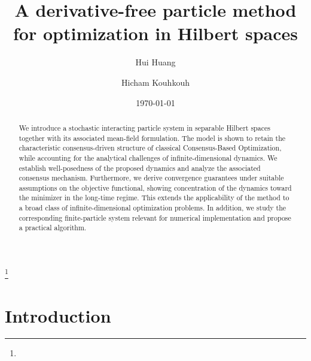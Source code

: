\documentclass[12pt]{amsart}
\numberwithin{equation}{section}
\begin{document}
\title[Particle method for optimization in Hilbert spaces]
{A derivative-free particle method for   optimization in Hilbert spaces}
\thanks{
}

\author{Hui Huang}
\address{Hui Huang \newline
Hunan University, 
School of Mathematics, \newline
Changsha, China
}

\author{Hicham Kouhkouh}
\address{Hicham Kouhkouh \newline 
University of Graz, 
Department of Mathematics and Scientific Computing -- NAWI, \newline
Graz, Austria
}



\date{\today}


\begin{abstract}
We introduce a stochastic interacting particle system in separable Hilbert spaces together with its associated mean-field formulation. The model is shown to retain the characteristic consensus-driven structure of classical Consensus-Based Optimization, while accounting for the analytical challenges of infinite-dimensional dynamics. We establish well-posedness of the proposed dynamics and analyze the associated consensus mechanism. Furthermore, we derive convergence guarantees under suitable assumptions on the objective functional, showing concentration of the dynamics toward the minimizer in the long-time regime. This extends the applicability of the method to a broad class of infinite-dimensional optimization problems. 
In addition, we study the corresponding finite-particle system relevant for numerical implementation and propose a practical algorithm.
\end{abstract}




\maketitle


\section{Introduction}
\end{document}
